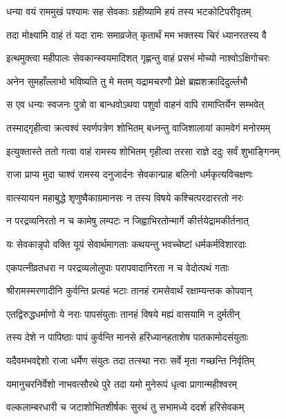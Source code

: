 \twolineshloka
{धन्या वयं राममुखं पश्यामः सह सेवकाः}
{ग्रहीष्यामि हयं तस्य भटकोटिपरीवृतम्}%

\twolineshloka
{तदा मोक्ष्यामि वाहं तं यदा रामः समाव्रजेत्}
{कृतार्थं मम भक्तस्य चिरं ध्यानरतस्य वै}%


\twolineshloka
{इत्थमुक्त्वा महीपालः सेवकान्स्वयमादिशत्}
{गृह्णन्तु वाहं प्रसभं मोच्यो नाश्वोऽक्षिगोचरः}%

\twolineshloka
{अनेन सुमहाँल्लाभो भविष्यति तु मे मतम्}
{यद्रामचरणौ प्रेक्षे ब्रह्मशक्रादिदुर्ल्लभौ}%

\twolineshloka
{स एव धन्यः स्वजनः पुत्रो वा बान्धवोऽथवा}
{पशुर्वा वाहनं वापि रामाप्तिर्येन सम्भवेत्}%

\twolineshloka
{तस्माद्गृहीत्वा क्रत्वश्वं स्वर्णपत्रेण शोभितम्}
{बध्नन्तु वाजिशालायां कामवेगं मनोरमम्}%

\twolineshloka
{इत्युक्तास्ते ततो गत्वा वाहं रामस्य शोभितम्}
{गृहीत्वा तरसा राज्ञे ददुः सर्वं शुभाङ्गिनम्}%

\twolineshloka
{राजा प्राप्य मुदा चाश्वं रामस्य दनुजार्दनः}
{सेवकान्प्राह बलिनो धर्मकृत्यविचक्षणः}%

\twolineshloka
{वात्स्यायन महाबुद्धे शृणुष्वैकाग्रमानसः}
{न तस्य विषये कश्चित्परदाररतो नरः}%

\twolineshloka
{न परद्रव्यनिरतो न च कामेषु लम्पटः}
{न जिह्वाभिरतोन्मार्गे कीर्त्तयेद्रामकीर्तनात्}%

\twolineshloka
{यः सेवकान्नृपो वक्ति यूयं सेवार्थमागताः}
{कथयन्तु भवच्चेष्टां धर्मकर्मविशारदाः}%

\twolineshloka
{एकपत्नीव्रतधरा न परद्रव्यलोलुपाः}
{परापवादानिरता न च वेदोत्पथं गताः}%

\twolineshloka
{श्रीरामस्मरणादीनि कुर्वन्ति प्रत्यहं भटाः}
{तानहं रामसेवार्थं रक्षाम्यन्तक कोपवान्}%

\twolineshloka
{एतद्विरुद्धधर्माणो ये नराः पापसंयुताः}
{तानहं विषये मह्यं वासयामि न दुर्मतीन्}%

\twolineshloka
{तस्य देशे न पापिष्ठाः पापं कुर्वन्ति मानसे}
{हरिध्यानहताशेष पातकामोदसंयुताः}%

\twolineshloka
{यदैवमभवद्देशो राजा धर्मेण संयुतः}
{तदा तत्स्था नराः सर्वे मृता गच्छन्ति निर्वृतिम्}%

\twolineshloka
{यमानुचरनिर्वेशो नाभवत्सौरथे पुरे}
{तदा यमो मुनेरूपं धृत्वा प्रागान्महीश्वरम्}%

\twolineshloka
{वल्कलाम्बरधारी च जटाशोभितशीर्षकः}
{सुरथं तु सभामध्ये ददर्श हरिसेवकम्}%


